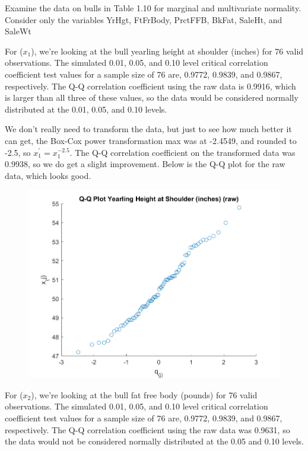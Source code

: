 Examine the data on bulls in Table 1.10 for marginal and multivariate normality. Consider
only the variables YrHgt, FtFrBody, PrctFFB, BkFat, SaleHt, and SaleWt

For ($x_{1}$), we're looking at the bull yearling height at shoulder (inches) for 76 valid observations. The simulated 0.01, 0.05, and 0.10 level critical correlation coefficient test values for a sample size of 76 are, 0.9772, 0.9839, and 0.9867, respectively. The Q-Q correlation coefficient using the raw data is 0.9916, which is larger than all three of these values, so the data would be considered normally distributed at the 0.01, 0.05, and 0.10 levels.

We don't really need to transform the data, but just to see how much better it can get, the Box-Cox power transformation max was at -2.4549, and rounded to -2.5, so $x_{1}^{\prime} = x_{1}^{-2.5}$. The Q-Q correlation coefficient on the transformed data was 0.9938, so we do get a slight improvement. Below is the Q-Q plot for the raw data, which looks good.

\begin{center}
    \begin{figure}[H]
        \centering
        \includegraphics[scale=0.6]{./matlab/chapter-4/sol4.38.qq.1.png}
    \end{figure}
\end{center}

For ($x_{2}$), we're looking at the bull fat free body (pounds) for 76 valid observations. The simulated 0.01, 0.05, and 0.10 level critical correlation coefficient test values for a sample size of 76 are, 0.9772, 0.9839, and 0.9867, respectively. The Q-Q correlation coefficient using the raw data was 0.9631, so the data would not be considered normally distributed at the 0.05 and 0.10 levels.

